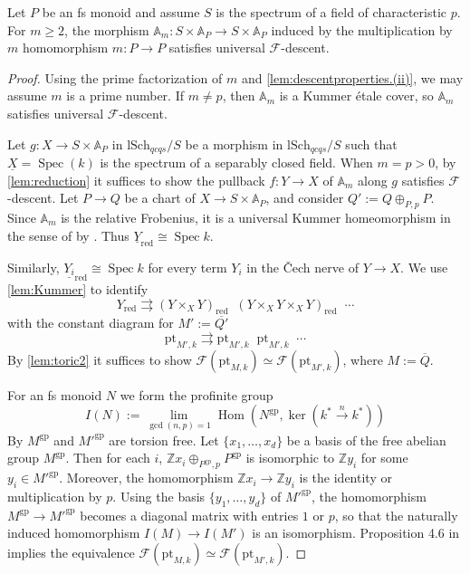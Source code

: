 \documentclass[10pt]{amsart}
\newcommand{\A}{\mathbb{A}}
\newcommand{\Z}{\mathbb{Z}}
\newcommand{\cF}{\mathcal{F}}
\newcommand{\gp}{\mathrm{gp}}
\DeclareMathOperator{\Hom}{Hom}
\DeclareMathOperator{\Spec}{Spec}
\newcommand{\ul}{\underline}
\newcommand{\ol}{\overline}
\newcommand{\lSch}{\mathrm{lSch}}
\DeclareMathOperator{\rightrightrightarrows}{\substack{\rightarrow \\[-1em] \rightarrow \\[-1em] \rightarrow}}
\DeclareMathOperator{\rightrightrightrightarrows}{\substack{\rightarrow\\[-1em] \rightarrow \\[-1em] \rightarrow\\[-1em] \rightarrow}}
\newcommand{\pt}{\mathrm{pt}}
\newcommand{\red}{\mathrm{red}}
\begin{document}
\begin{lemma}
\label{lem:AP}
Let $P$ be an fs monoid and assume $S$ is the spectrum of a field of characteristic $p$.
For $m\geq 2$,
the morphism $\A_m\colon S\times \A_P\to S\times \A_P$ induced by the multiplication by 
$m$ homomorphism $m\colon P\to P$ satisfies universal $\cF$-descent.
\end{lemma}
\begin{proof}
Using the prime factorization of $m$ and \ref{lem:descentproperties.(ii)},
we may assume $m$ is a prime number.
If $m\neq p$,
then $\A_m$ is a Kummer \'etale cover,
so $\A_m$ satisfies universal $\cF$-descent.

Let $g\colon X\to S\times \A_P$ in $\lSch_{qcqs}/S$ be a morphism in $\lSch_{qcqs}/S$ 
such that $\ul{X}=\Spec(k)$ is the spectrum of a separably closed field.
When $m=p>0$, 
by \cref{lem:reduction}
it suffices to show the 
pullback $f\colon Y\to X$ of $\A_m$ along $g$ satisfies $\cF$-descent.
Let $P\to Q$ be a chart of $X\to S\times \A_P$,
and consider $Q':=Q\oplus_{P,p}P$.
Since $\A_m$ is the relative Frobenius, 
it is a universal Kummer homeomorphism in the sense of \cite[D\'efinition 2.1]{zbMATH01594939} 
by \cite[Th\'eor\`eme 2.4]{zbMATH01594939}.
Thus $\ul{Y}_\red \cong \Spec{k}$.

Similarly,
$\ul{Y_i}_\red \cong \Spec{k}$ for every term $Y_i$ in the \v{C}ech nerve of $Y\to X$.
We use \cref{lem:Kummer} to identify 
\[
Y_\red \rightrightarrows (Y\times_X Y)_\red
\rightrightrightarrows
(Y\times_X Y\times_X Y)_\red 
\rightrightrightrightarrows
\cdots
\]
with the constant diagram for $M':=\ol{Q'}$
\[
\pt_{M',k} \rightrightarrows \pt_{M',k}
\rightrightrightarrows
\pt_{M',k}
\rightrightrightrightarrows
\cdots
\]
By \cref{lem:toric2}
it suffices to show $\cF(\pt_{M,k})\simeq \cF(\pt_{M',k})$,
where $M:=\ol{Q}$.

For an fs monoid $N$ we form the profinite group
\[
I(N):=\lim_{\gcd(n,p)=1} \Hom(N^\gp,\ker(k^*\xrightarrow{n} k^*))
\]
By \cite[Proposition I.1.3.5.(2)]{Ogu}
$M^\gp$ and $M'^\gp$ are torsion free.
Let $\{x_1,\ldots,x_d\}$ be a basis of the free abelian group $M^\gp$.
Then for each $i$, $\Z x_i\oplus_{P^\gp,p}P^\gp$ is isomorphic to $\Z y_i$ for some $y_i\in M'^\gp$.
Moreover, the homomorphism $\Z x_i\to \Z y_i$ is the identity or multiplication by $p$.
Using the basis $\{y_1,\ldots,y_d\}$ of $M'^\gp$,
the homomorphism $M^\gp\to M'^\gp$ becomes a diagonal matrix with entries $1$ or $p$,
so that the naturally induced homomorphism $I(M)\to I(M')$ is an isomorphism.
Proposition 4.6 in \cite{MR1457738} implies the equivalence $\cF(\pt_{M,k})\simeq \cF(\pt_{M',k})$.
\end{proof}
\end{document}
